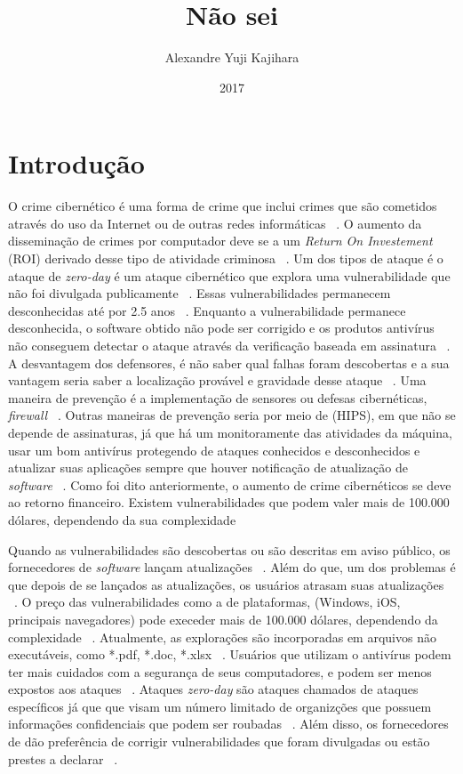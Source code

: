 \documentclass[brazil, utf8]{article}
\begin{document}
\title{Não sei}
\author{Alexandre Yuji Kajihara}
\date{2017}

\maketitle 

\section{Introdução}
O crime cibernético é uma forma de crime que inclui crimes que são cometidos através do uso da Internet ou de outras redes 
informáticas ~\cite{Armin:2015}. O aumento da disseminação de crimes por computador deve se a um \textit{Return On Investement}
(ROI) derivado desse tipo de atividade criminosa ~\cite{Armin:2015}. Um dos tipos de ataque é o ataque de \textit{zero-day} é um 
ataque cibernético que explora uma vulnerabilidade que não foi divulgada publicamente ~\cite{Bilge:2012}. Essas vulnerabilidades 
permanecem desconhecidas até por 2.5 anos ~\cite{Bilge:2012}. Enquanto a vulnerabilidade permanece desconhecida, o software obtido 
não pode ser corrigido e os produtos antivírus não conseguem detectar o ataque através da verificação baseada em assinatura 
~\cite{Bilge:2012}. A desvantagem dos defensores, é não saber qual falhas foram descobertas e a sua vantagem seria saber a 
localização provável e gravidade desse ataque ~\cite{Last:2016}. Uma maneira de prevenção é a implementação de sensores ou defesas 
cibernéticas, \textit{firewall} ~\cite{Last:2016}. Outras maneiras de prevenção seria por meio de  (HIPS), em que não se depende de assinaturas, já que há um monitoramente das atividades da máquina, usar um bom antivírus  
protegendo de ataques conhecidos e desconhecidos e atualizar suas aplicações sempre que houver notificação de atualização de
\textit{software} ~\cite{Kumar:2016}. Como foi dito anteriormente, o aumento de crime cibernéticos se deve ao retorno financeiro. Existem vulnerabilidades que podem valer mais de 100.000 dólares, dependendo da sua complexidade

Quando as vulnerabilidades são descobertas ou são descritas em aviso 
público, os fornecedores de \textit{software} lançam atualizações ~\cite{Bilge:2012}. Além do que, 
um dos problemas é que depois de se lançados as atualizações, os usuários atrasam suas atualizações
~\cite{Bilge:2012}. O preço das vulnerabilidades como a de plataformas, (Windows, iOS, principais 
navegadores) pode execeder mais de 100.000 dólares, dependendo da complexidade ~\cite{Bilge:2012}.
Atualmente, as explorações são incorporadas em arquivos não executáveis, como *.pdf, *.doc, *.xlsx
~\cite{Bilge:2012}. Usuários que utilizam o antivírus podem ter mais cuidados com a segurança de 
seus computadores, e podem ser menos expostos aos ataques ~\cite{Bilge:2012}. Ataques \textit{
zero-day} são ataques chamados de ataques específicos já que que visam um número limitado de 
organizções que possuem informações confidenciais que podem ser roubadas ~\cite{Bilge:2012}. Além 
disso, os fornecedores de  dão preferência de corrigir vulnerabilidades que foram 
divulgadas ou estão prestes a declarar ~\cite{Bilge:2012}.
\end{document}
